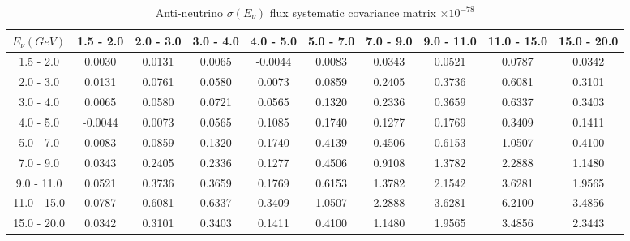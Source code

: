 \documentclass[aps,prl,twocolumn,showpacs,superscriptaddress,nofootinbib]{revtex4}
\begin{document}
\begingroup
\squeezetable
\begin{table}[h]
\tabcolsep=0.11cm
\begin{tabular}{c|ccccccccc}
$E_{\nu}(GeV)$ & 1.5 - 2.0 & 2.0 - 3.0 & 3.0 - 4.0 & 4.0 - 5.0 & 5.0 - 7.0 & 7.0 - 9.0 & 9.0 - 11.0 & 11.0 - 15.0 & 15.0 - 20.0\\
\hline
1.5 - 2.0 & 0.0030	&0.0131	&0.0065	&-0.0044&0.0083	&0.0343	&0.0521	&0.0787	&0.0342	\\
 2.0 - 3.0 &0.0131	&0.0761	&0.0580	&0.0073	&0.0859	&0.2405	&0.3736	&0.6081	&0.3101	\\
3.0 - 4.0 &0.0065	&0.0580	&0.0721	&0.0565	&0.1320	&0.2336	&0.3659	&0.6337	&0.3403	\\
4.0 - 5.0 &-0.0044	&0.0073	&0.0565	&0.1085	&0.1740	&0.1277	&0.1769	&0.3409	&0.1411	\\
5.0 - 7.0 &0.0083	&0.0859	&0.1320	&0.1740	&0.4139	&0.4506	&0.6153	&1.0507	&0.4100	\\
7.0 - 9.0 &0.0343	&0.2405	&0.2336	&0.1277	&0.4506	&0.9108	&1.3782	&2.2888	&1.1480	\\
9.0 - 11.0 &0.0521	&0.3736	&0.3659	&0.1769	&0.6153	&1.3782	&2.1542	&3.6281	&1.9565	\\
11.0 - 15.0 &0.0787	&0.6081	&0.6337	&0.3409	&1.0507	&2.2888	&3.6281	&6.2100	&3.4856	\\
15.0 - 20.0& 0.0342	&0.3101	&0.3403	&0.1411	&0.4100	&1.1480	&1.9565	&3.4856	&2.3443	\\
\end{tabular}
\caption{Anti-neutrino $\sigma(E_\nu)$ flux systematic covariance matrix  $\times 10^{-78}$ }
\label{tab:enuB-flux}
\end{table}
\endgroup
\end{document}
